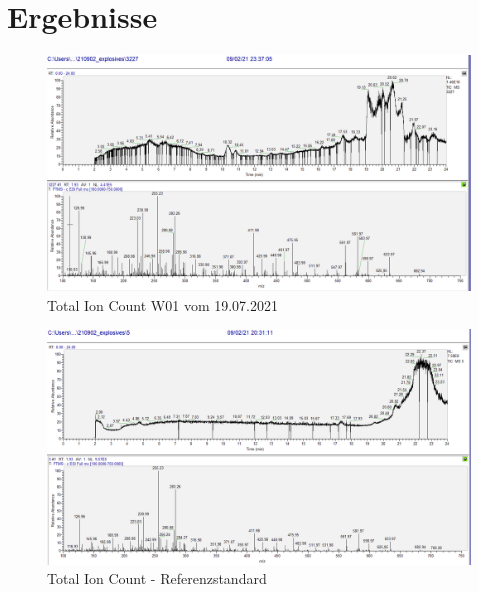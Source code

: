  

\chapter{Ergebnisse}

\begin{figure}[htb]
\includegraphics[height=\textheight,%
                   width=\textwidth,%
                   keepaspectratio]{Bilder/TIC_3227_SampleW1.PNG}
\caption{Total Ion Count W01 vom 19.07.2021}
\end{figure}
\begin{figure}[htb]
\includegraphics[height=\textheight,%
                   width=\textwidth,%
                   keepaspectratio]{Bilder/TIC_5ppbSTandard.PNG}
\caption{Total Ion Count - Referenzstandard}
\end{figure}
